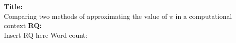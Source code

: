 \documentclass[12pt,a4paper]{article}
\begin{document}
\doublespacing %


\begin{titlepage}
    \begin{center}
    \vspace*{4cm}
    \textbf{Title:}\\
        Comparing two methods of approximating the value of $\pi$ in a
        computational context
    \vspace{1cm}
    \textbf{RQ:}\\
    Insert RQ here
    \vspace{4cm}
    Word count:
    \vfill
    \vspace{0.1cm}
    \end{center}
    \end{titlepage}



\begin{center}
\tableofcontents
\vspace{1in}

\end{center}




\newpage





\newpage

\end{document}
